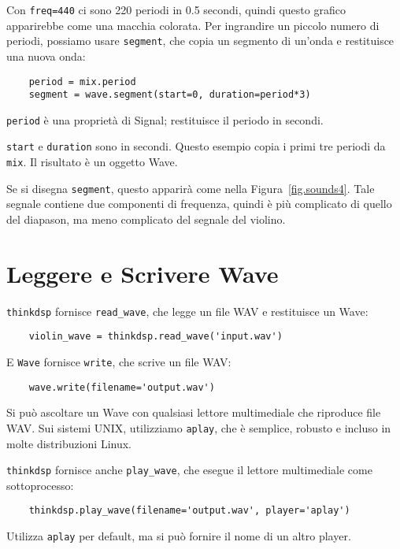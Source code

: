 \documentclass[12pt,a4paper]{book}
\begin{document}
Con {\tt freq=440} ci sono 220 periodi in 0.5 secondi, quindi questo grafico apparirebbe come una macchia colorata. Per ingrandire un piccolo numero di periodi, possiamo usare {\tt segment}, che copia un segmento di un'onda e restituisce una nuova onda:

\begin{verbatim} 
    period = mix.period
    segment = wave.segment(start=0, duration=period*3)
 \end{verbatim} 

{\tt period} è una proprietà di Signal; restituisce il periodo in secondi.

{\tt start} e {\tt duration} sono in secondi. Questo esempio copia i primi tre periodi da {\tt mix}. Il risultato è un oggetto Wave.

Se si disegna {\tt segment}, questo apparirà come nella Figura~\ref{fig.sounds4}. Tale segnale contiene due componenti di frequenza, quindi è più complicato di quello del diapason, ma meno complicato del segnale del violino.

\section{Leggere e Scrivere Wave} 

{\tt thinkdsp} fornisce \verb"read_wave", che legge un file WAV e restituisce un Wave:

\begin{verbatim} 
    violin_wave = thinkdsp.read_wave('input.wav')
 \end{verbatim} 

E {\tt Wave} fornisce {\tt write}, che scrive un file WAV:

\begin{verbatim} 
    wave.write(filename='output.wav')
 \end{verbatim} 

Si può ascoltare un Wave con qualsiasi lettore multimediale che riproduce file WAV. Sui sistemi UNIX, utilizziamo {\tt aplay}, che è semplice, robusto e incluso in molte distribuzioni Linux.

{\tt thinkdsp} fornisce anche \verb"play_wave", che esegue il lettore multimediale come sottoprocesso:

\begin{verbatim} 
    thinkdsp.play_wave(filename='output.wav', player='aplay')
 \end{verbatim} 

Utilizza {\tt aplay} per default, ma si può fornire il nome di un altro player.
\end{document}
